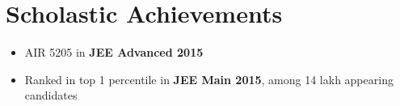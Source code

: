 \section*{\sc Scholastic Achievements}
\vspace{-2mm}
\hrulefill
\vspace{.2cm}

\begin{itemize}
\item AIR 5205 in \textbf{JEE Advanced 2015}
\item Ranked in top 1 percentile in \textbf{JEE Main 2015}, among 14 lakh appearing candidates

\end{itemize}
